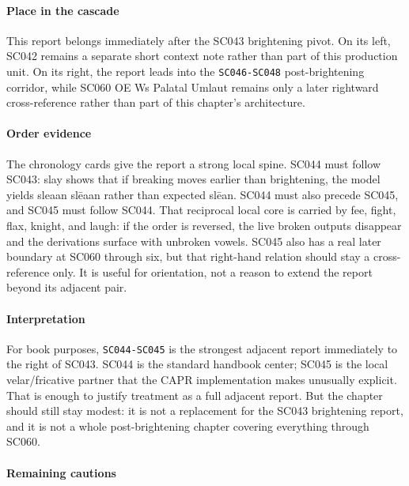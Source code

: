 \documentclass[
  british,
  a4paper,
]{article}
\begin{document}
\paragraph{Place in the cascade}\label{place-in-the-cascade-28}

This report belongs immediately after the SC043 brightening pivot. On
its left, SC042 remains a separate short context note rather than part
of this production unit. On its right, the report leads into the
\texttt{SC046-SC048} post-brightening corridor, while SC060 OE Ws
Palatal Umlaut remains only a later rightward cross-reference rather
than part of this chapter's architecture.

\paragraph{Order evidence}\label{order-evidence-28}

The chronology cards give the report a strong local spine. SC044 must
follow SC043: slay shows that if breaking moves earlier than
brightening, the model yields sleaan \textbar{} slēaan rather than
expected slēan. SC044 must also precede SC045, and SC045 must follow
SC044. That reciprocal local core is carried by fee, fight, flax,
knight, and laugh: if the order is reversed, the live broken outputs
disappear and the derivations surface with unbroken vowels. SC045 also
has a real later boundary at SC060 through six, but that right-hand
relation should stay a cross-reference only. It is useful for
orientation, not a reason to extend the report beyond its adjacent pair.

\paragraph{Interpretation}\label{interpretation-28}

For book purposes, \texttt{SC044-SC045} is the strongest adjacent report
immediately to the right of SC043. SC044 is the standard handbook
center; SC045 is the local velar/fricative partner that the CAPR
implementation makes unusually explicit. That is enough to justify
treatment as a full adjacent report. But the chapter should still stay
modest: it is not a replacement for the SC043 brightening report, and it
is not a whole post-brightening chapter covering everything through
SC060.

\paragraph{Remaining cautions}\label{remaining-cautions-28}
\end{document}
